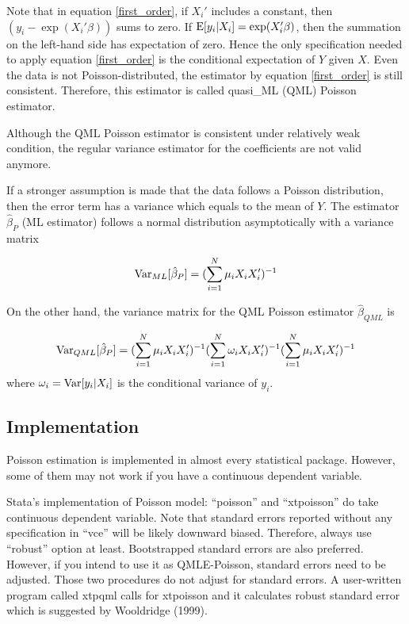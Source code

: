 Note that in equation \ref{first_order}, if $X_i'$ includes a constant, then $(y_i - \exp (X_i' \beta) )$ sums to zero.  If ${\rm E} [y_i|X_i] = \exp (X_i' \beta)$, then the summation on the left-hand side has expectation of zero.  Hence the only specification needed to apply equation \ref{first_order} is the conditional expectation of $Y$ given $X$.  Even the data is not Poisson-distributed, the estimator by equation \ref{first_order} is still consistent.  Therefore, this estimator is called quasi\_ML (QML) Poisson estimator.


Although the QML Poisson estimator is consistent under relatively weak condition, the regular variance estimator for the coefficients are not valid anymore.

If a stronger assumption is made that the data follows a Poisson distribution, then the error term has a variance which equals to the mean of $Y$.  The estimator $\hat \beta_P$ (ML estimator) follows a normal distribution asymptotically with a variance matrix



\begin{equation}
 {\rm Var}_{ML} [\hat \beta_P] = (\sum_{i=1}^N \mu_i X_i X_i')^{-1}
\end{equation}


On the other hand, the variance matrix for the  QML Poisson estimator $\hat \beta_{QML}$ is 

\begin{equation}
 {\rm Var}_{QML} [\hat \beta_P] = (\sum_{i=1}^N \mu_i X_i X_i')^{-1} (\sum_{i=1}^N \omega_i X_i X_i')^{-1} (\sum_{i=1}^N \mu_i X_i X_i')^{-1}
\end{equation}
where $\omega_i={\rm Var} [y_i|X_i] $ is the conditional variance of $y_i$.




\subsection{Implementation}

Poisson estimation is implemented in almost every statistical package.
However, some of them may not work if you have a continuous dependent
variable.

Stata's implementation of Poisson model: ``poisson'' and ``xtpoisson'' do take
continuous dependent variable.  Note that standard errors reported
without any specification in ``vce'' will be likely downward biased.
Therefore, always use ``robust'' option at least.  Bootstrapped
standard errors are also preferred.  However, if you intend to use it
as QMLE-Poisson, standard errors need to be adjusted.  Those two
procedures do not adjust for standard errors.  A user-written program
called xtpqml calls for xtpoisson and it calculates robust standard
error which is suggested by Wooldridge (1999).


